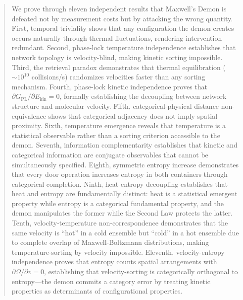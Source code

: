\documentclass[12pt,a4paper]{article}
\theoremstyle{definition}
\theoremstyle{remark}
\begin{document}
\begin{abstract}
  We prove through eleven independent results that Maxwell's Demon is defeated not by measurement costs but by attacking the wrong quantity. First, temporal triviality shows that any configuration the demon creates occurs naturally through thermal fluctuations, rendering intervention redundant. Second, phase-lock temperature independence establishes that network topology is velocity-blind, making kinetic sorting impossible. Third, the retrieval paradox demonstrates that thermal equilibration ($\sim 10^{10}$ collisions/s) randomizes velocities faster than any sorting mechanism. Fourth, phase-lock kinetic independence proves that $\partial G_{\text{PL}}/\partial E_{\text{kin}} = 0$, formally establishing the decoupling between network structure and molecular velocity. Fifth, categorical-physical distance non-equivalence shows that categorical adjacency does not imply spatial proximity. Sixth, temperature emergence reveals that temperature is a statistical observable rather than a sorting criterion accessible to the demon. Seventh, information complementarity establishes that kinetic and categorical information are conjugate observables that cannot be simultaneously specified. Eighth, symmetric entropy increase demonstrates that every door operation increases entropy in both containers through categorical completion. Ninth, heat-entropy decoupling establishes that heat and entropy are fundamentally distinct: heat is a statistical emergent property while entropy is a categorical fundamental property, and the demon manipulates the former while the Second Law protects the latter. Tenth, velocity-temperature non-correspondence demonstrates that the same velocity is ``hot'' in a cold ensemble but ``cold'' in a hot ensemble due to complete overlap of Maxwell-Boltzmann distributions, making temperature-sorting by velocity impossible. Eleventh, velocity-entropy independence proves that entropy counts spatial arrangements with $\partial \Omega / \partial v = 0$, establishing that velocity-sorting is categorically orthogonal to entropy---the demon commits a category error by treating kinetic properties as determinants of configurational properties.


\end{abstract}
\end{document}
